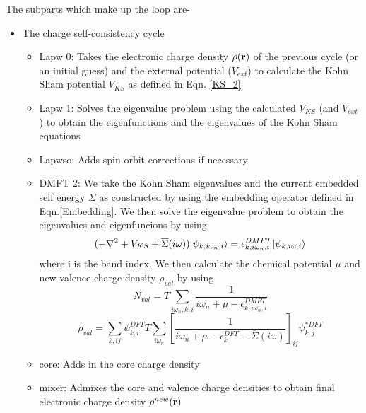 \documentclass[10pt]{ruthesis}
\begin{document}
The subparts which make up the loop are-
\begin{itemize}
\item The charge self-consistency cycle 
	\begin{itemize}
	 \item Lapw 0: Takes the  electronic charge density $\rho(\mathbf{r})$ of the previous cycle (or an initial guess) and the external potential ($V_{ext}$) to calculate the Kohn Sham potential $V_{KS}$ as defined in Eqn. \ref{KS_2}
	\item Lapw 1: Solves the eigenvalue problem using the calculated $V_{KS}$ (and $V_{ext}$) to obtain the eigenfunctions and the eigenvalues of the Kohn Sham equations
	\item Lapwso: Adds spin-orbit corrections if necessary 
	\item DMFT 2: We take the Kohn Sham eigenvalues and the current embedded self energy $\overline{\Sigma}$ as constructed by using the embedding operator defined in Eqn.\ref{Embedding}. We then solve the eigenvalue problem to obtain the eigenvalues and eigenfuncions by using 
	\begin{equation}
	(-\nabla^2+V_{KS}+\overline{\Sigma}(i\omega)) |\psi_{k,i\omega_n,i} \rangle = \epsilon^{DMFT}_{k,i\omega_n,i}|\psi_{k,i\omega,i} \rangle
	\end{equation}	 
	where i is the band index. We then calculate the chemical potential $\mu$ and new valence charge density $\rho_{val}$ by using
	\begin{equation}
	 N_{val}= T \sum_{i\omega_n,k,i}\dfrac{1}{i\omega_n +\mu -\epsilon^{DMFT}_{k,i\omega_n,i}}
	 \end{equation} 
	 \begin{equation}
	 \rho_{val}=\sum_{k,ij} \psi^{DFT}_{k,i} T \sum_{i\omega_n}\left[\dfrac{1}{i\omega_n +\mu -\epsilon^{DFT}_{k}-\overline{\Sigma}(i\omega)}\right]_{ij}\psi^{*DFT}_{k,j}
	 \end{equation}
	\item core: Adds in the core charge density
	\item mixer: Admixes the core and valence charge densities to obtain final electronic charge density $\rho^{new}(\mathbf{r})$	
	 \end{itemize}
\end{itemize}
\end{document}
